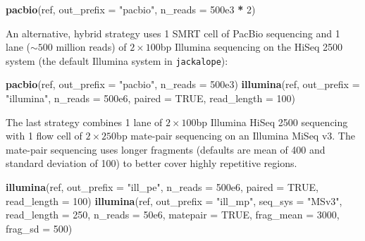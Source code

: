 \documentclass[12pt,]{article}
\newenvironment{Shaded}{\begin{snugshade}}{\end{snugshade}}
\newcommand{\DataTypeTok}[1]{\textcolor[rgb]{0.13,0.29,0.53}{#1}}
\newcommand{\DecValTok}[1]{\textcolor[rgb]{0.00,0.00,0.81}{#1}}
\newcommand{\FloatTok}[1]{\textcolor[rgb]{0.00,0.00,0.81}{#1}}
\newcommand{\KeywordTok}[1]{\textcolor[rgb]{0.13,0.29,0.53}{\textbf{#1}}}
\newcommand{\NormalTok}[1]{#1}
\newcommand{\OperatorTok}[1]{\textcolor[rgb]{0.81,0.36,0.00}{\textbf{#1}}}
\newcommand{\OtherTok}[1]{\textcolor[rgb]{0.56,0.35,0.01}{#1}}
\newcommand{\StringTok}[1]{\textcolor[rgb]{0.31,0.60,0.02}{#1}}
\begin{document}
\begin{Shaded}
\begin{Highlighting}[]
\KeywordTok{pacbio}\NormalTok{(ref, }\DataTypeTok{out_prefix =} \StringTok{"pacbio"}\NormalTok{,}
       \DataTypeTok{n_reads =} \FloatTok{500e3} \OperatorTok{*}\StringTok{ }\DecValTok{2}\NormalTok{)}
\end{Highlighting}
\end{Shaded}

An alternative, hybrid strategy uses
1 SMRT cell of PacBio sequencing and
1 lane (\(\sim 500\) million reads) of \(2 \times 100\)bp Illumina
sequencing on the HiSeq 2500 system (the default Illumina system in \texttt{jackalope}):

\begin{Shaded}
\begin{Highlighting}[]
\KeywordTok{pacbio}\NormalTok{(ref, }\DataTypeTok{out_prefix =} \StringTok{"pacbio"}\NormalTok{,}
       \DataTypeTok{n_reads =} \FloatTok{500e3}\NormalTok{)}
\KeywordTok{illumina}\NormalTok{(ref, }\DataTypeTok{out_prefix =} \StringTok{"illumina"}\NormalTok{,}
         \DataTypeTok{n_reads =} \FloatTok{500e6}\NormalTok{, }\DataTypeTok{paired =} \OtherTok{TRUE}\NormalTok{,}
         \DataTypeTok{read_length =} \DecValTok{100}\NormalTok{)}
\end{Highlighting}
\end{Shaded}

The last strategy combines 1 lane of \(2 \times 100\)bp Illumina HiSeq 2500 sequencing
with 1 flow cell of \(2 \times 250\)bp mate-pair sequencing on an Illumina MiSeq v3.
The mate-pair sequencing uses longer fragments (defaults are mean of 400 and
standard deviation of 100) to better cover highly
repetitive regions.

\begin{Shaded}
\begin{Highlighting}[]
\KeywordTok{illumina}\NormalTok{(ref, }\DataTypeTok{out_prefix =} \StringTok{"ill_pe"}\NormalTok{,}
         \DataTypeTok{n_reads =} \FloatTok{500e6}\NormalTok{, }\DataTypeTok{paired =} \OtherTok{TRUE}\NormalTok{,}
         \DataTypeTok{read_length =} \DecValTok{100}\NormalTok{)}
\KeywordTok{illumina}\NormalTok{(ref, }\DataTypeTok{out_prefix =} \StringTok{"ill_mp"}\NormalTok{,}
         \DataTypeTok{seq_sys =} \StringTok{"MSv3"}\NormalTok{,}
         \DataTypeTok{read_length =} \DecValTok{250}\NormalTok{,}
         \DataTypeTok{n_reads =} \FloatTok{50e6}\NormalTok{, }\DataTypeTok{matepair =} \OtherTok{TRUE}\NormalTok{, }
         \DataTypeTok{frag_mean =} \DecValTok{3000}\NormalTok{, }\DataTypeTok{frag_sd =} \DecValTok{500}\NormalTok{)}
\end{Highlighting}
\end{Shaded}
\end{document}
